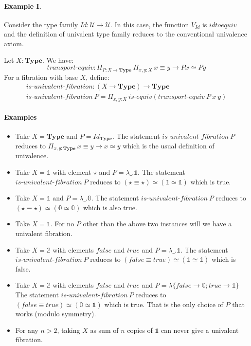 \documentclass[format=acmlarge,review,natbib]{acmart}
\newcommand{\Typ}{\mathbf{Type}}
\newcommand{\zt}{\mathbb{0}}
\newcommand{\ot}{\mathbb{1}}
\newcommand{\bt}{\mathbb{2}}
\newcommand{\fc}{\mathit{false}}
\newcommand{\tc}{\mathit{true}}
\begin{document}
\paragraph*{Example I.} Consider the type family
$\mathit{Id} : \mathcal{U} \to \mathcal{U}$. In this case, the function
$V_{\mathit{Id}}$ is $\mathit{idtoequiv}$ and the definition of univalent type
family reduces to the conventional univalence axiom.







\newpage

Let $X : \Typ$. We have:
\[
\textit{transport-equiv} : \Pi_{P : X \to \Typ}~ \Pi_{x,y:X}~
    x \equiv y  \to P x \simeq P y
\]
For a fibration with base $X$, define:
\[\begin{array}{l}
\textit{is-univalent-fibration} : (X \to \Typ) \to \Typ \\
\textit{is-univalent-fibration}~P =
    \Pi_{x,y:X}~\textit{is-equiv} (\textit{transport-equiv}~P~x~y)
\end{array}\]

\noindent\paragraph*{Examples}
\begin{itemize}
\item Take $X = \Typ$ and $P = \mathit{Id}_{\Typ}$. The statement
  $\textit{is-univalent-fibration}~P$ reduces to $\Pi_{x,y:\Typ}~x \equiv y \to
  x \simeq y$ which is the usual definition of univalence.
\item Take $X = \ot$ with element $\star$ and $P = \lambda \_. \ot$. The
  statement $\textit{is-univalent-fibration}~P$ reduces to
  $(\star\equiv\star)\simeq(\ot\simeq\ot)$ which is true.
\item Take $X = \ot$ and $P = \lambda \_. \zt$. The statement
  $\textit{is-univalent-fibration}~P$ reduces to
  $(\star\equiv\star)\simeq(\zt\simeq\zt)$ which is also true.
\item Take $X = \ot$. For no $P$ other than the above two instances will
  we have a univalent fibration.
\item Take $X = \bt$ with elements $\fc$ and $\tc$ and
  $P = \lambda \_. \ot$. The statement
  $\textit{is-univalent-fibration}~P$ reduces to $(\fc \equiv \tc) \simeq
  (\ot\simeq\ot)$ which is false.
\item Take $X = \bt$ with elements $\fc$ and $\tc$ and
  $P = \lambda \{ \fc \to \zt; \tc \to \ot \}$ The statement
  $\textit{is-univalent-fibration}~P$ reduces to $(\fc \equiv \tc) \simeq
  (\zt\simeq\ot)$ which is true. That is the only choice of $P$
  that works (modulo symmetry).
\item For any $n > 2$, taking $X$ as sum of $n$ copies of $\ot$ can never
  give a univalent fibration.
\end{itemize}
\end{document}
